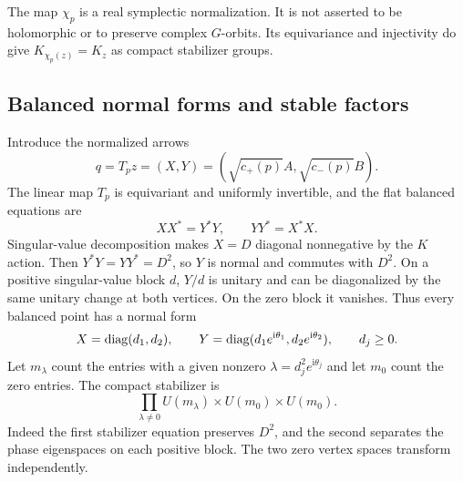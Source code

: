 The map $\chi_p$ is a real symplectic normalization.
It is not asserted to be holomorphic or to preserve
complex $G$-orbits. Its equivariance and injectivity do
give $K_{\chi_p(z)}=K_z$ as compact stabilizer groups.

\subsection{Balanced normal forms and stable factors}

Introduce the normalized arrows
\begin{equation}\label{eq:normalized-arrows}
 q=T_pz=(X,Y)=(\sqrt{c_+(p)}A,\sqrt{c_-(p)}B).
\end{equation}
The linear map $T_p$ is equivariant and uniformly
invertible, and the flat balanced equations are
\begin{equation}\label{eq:balanced-equations}
                    XX^*=Y^*Y,\qquad YY^*=X^*X.
\end{equation}
Singular-value decomposition makes $X=D$ diagonal
nonnegative by the $K$ action. Then $Y^*Y=YY^*=D^2$,
so $Y$ is normal and commutes with $D^2$. On a positive
singular-value block $d$, $Y/d$ is unitary and can be
diagonalized by the same unitary change at both vertices.
On the zero block it vanishes. Thus every balanced point
has a normal form
\begin{equation}\label{eq:balanced-normal-form}
 X=\operatorname{diag}(d_1,d_2),\qquad
 Y=\operatorname{diag}(d_1e^{\mathrm i\theta_1},d_2e^{\mathrm i\theta_2}),
                                      \qquad d_j\ge0.
\end{equation}
Let $m_\lambda$ count the entries with a given nonzero
$\lambda=d_j^2e^{\mathrm i\theta_j}$ and let $m_0$ count
the zero entries. The compact stabilizer is
\begin{equation}\label{eq:balanced-stabilizer}
 \prod_{\lambda\ne0}U(m_\lambda)\times U(m_0)\times U(m_0).
\end{equation}
Indeed the first stabilizer equation preserves $D^2$,
and the second separates the phase eigenspaces on each
positive block. The two zero vertex spaces transform
independently.

